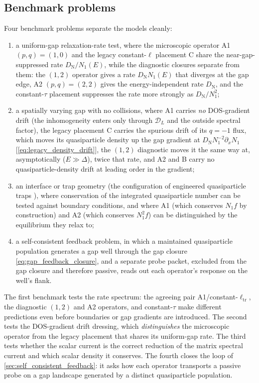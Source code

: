 \documentclass[
  aps,
  prb,
  preprint,
  superscriptaddress,
  longbibliography,
  nofootinbib
]{revtex4-2}
\newcommand{\elltr}{\ell_{\mathrm{tr}}}
\newcommand{\DOS}{N_1}
\newcommand{\DN}{D_{\mathrm{N}}}
\begin{document}
\subsection{Benchmark problems}

Four benchmark problems separate the models cleanly:
\begin{enumerate}
  \item a uniform-gap relaxation-rate test, where the microscopic operator A1
  \((p,q)=(1,0)\) and the legacy constant-\(\ell\) placement C share the
  near-gap-suppressed rate \(\DN/\DOS(E)\), while the diagnostic closures
  separate from them: the \((1,2)\) operator gives a rate
  \(\DN\DOS(E)\) that diverges at the gap edge, A2 \((p,q)=(2,2)\) gives
  the energy-independent rate \(\DN\), and the constant-\(\tau\) placement
  suppresses the rate more strongly as \(\DN/\DOS^2\);
  \item a spatially varying gap with no collisions, where A1
  carries \emph{no} DOS-gradient drift (the inhomogeneity enters only
  through \(\mathcal{D}_L\) and the outside spectral factor), the legacy
  placement C carries the spurious drift of its \(q=-1\) flux, which
  moves its quasiparticle density up the gap gradient at
  \(\DN\DOS^{-2}\partial_x\DOS\) [\cref{eq:legacy_density_drift}], the
  \((1,2)\) diagnostic moves it the same way at, asymptotically
  (\(E\gg\Delta\)), twice that rate, and A2 and B carry no
  quasiparticle-density drift at leading order in the gradient;
  \item an interface or trap geometry (the configuration of engineered
  quasiparticle traps \cite{riwar2016,hosseinkhani2018,riwar2019}), where conservation of the integrated
  quasiparticle number can be tested against boundary conditions, and where
  A1 (which conserves \(\DOS f\) by construction) and A2 (which conserves
  \(\DOS^2 f\)) can be distinguished by the equilibrium they relax to;
  \item a self-consistent feedback problem, in which a maintained
  quasiparticle population generates a gap well through the gap closure
  \cref{eq:gap_feedback_closure}, and a separate probe packet, excluded
  from the gap closure and therefore passive, reads out each operator's
  response on the well's flank.
\end{enumerate}
The first benchmark tests the rate spectrum: the agreeing pair
A1/constant-\(\elltr\), the diagnostic \((1,2)\) and A2 operators, and
constant-\(\tau\) make different predictions even before boundaries or gap
gradients are introduced. The second
tests the DOS-gradient drift dressing, which \emph{distinguishes} the
microscopic operator from the legacy placement that shares its
uniform-gap rate. The third tests whether the scalar
current is the correct reduction of the matrix spectral current and which scalar
density it conserves. The fourth closes the loop of
\cref{sec:self_consistent_feedback}: it asks how each operator transports
a passive probe on a gap landscape generated by a distinct quasiparticle
population.
\end{document}
